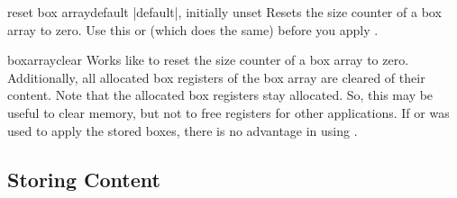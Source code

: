 \enlargethispage*{20mm}

\begin{docTcbKey}[][doc new=2015-07-13]{reset box array}{}{default |default|, initially unset}
  Resets the size counter of a box array  to zero.
  Use this or  (which does the same) before
  you apply .
\begin{dispListing}
\end{dispListing}
\end{docTcbKey}

\clearpage
\begin{docCommand}[doc new=2015-07-13]{boxarrayclear}{}
  Works like  to reset the size counter of a
  box array  to zero. Additionally, all allocated box registers
  of the box array are cleared of their content.
  Note that the allocated box registers stay allocated. So, this may be
  useful to clear memory, but not to free registers for other applications.
  If  or  was used to
  apply the stored boxes, there is no advantage in using .
\begin{dispListing}
\boxarrayclear            %
\end{dispListing}
\end{docCommand}



\subsection{Storing Content}\label{subsec:magazine_storing}

